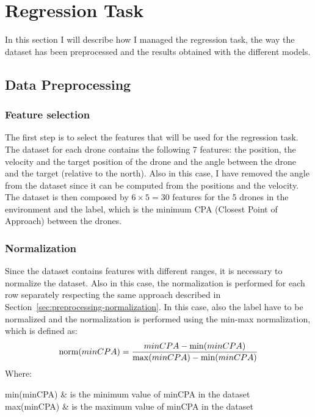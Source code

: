\section{Regression Task} \label{sec:regression}
In this section I will describe how I managed the regression task, the way the dataset has been preprocessed and the results obtained with the different models.

\subsection{Data Preprocessing} \label{sec:preprocessing-regression}

\subsubsection{Feature selection} \label{sec:preprocessing-feature-selection-regression}
The first step is to select the features that will be used for the regression task.
The dataset for each drone contains the following 7 features: the position, the velocity and the target position of the drone and the angle between the drone and the target (relative to the north).
Also in this case, I have removed the angle from the dataset since it can be computed from the positions and the velocity.
The dataset is then composed by $6 \times 5 = 30$ features for the 5 drones in the environment and the label, which is the minimum CPA (Closest Point of Approach) between the drones.

\subsubsection{Normalization} \label{sec:preprocessing-normalization-regression}
Since the dataset contains features with different ranges, it is necessary to normalize the dataset.
Also in this case, the normalization is performed for each row separately respecting the same approach described in Section~\ref{sec:preprocessing-normalization}.
In this case, also the label have to be normalized and the normalization is performed using the min-max normalization, which is defined as:
\begin{equation}
    \label{eq:min-max-normalization}
    \operatorname{norm}(minCPA) = \frac{minCPA - \min(minCPA)}{\max(minCPA) - \min(minCPA)}
\end{equation}
Where:
\begin{conditions}
    min(minCPA) & is the minimum value of minCPA in the dataset \\
    max(minCPA) & is the maximum value of minCPA in the dataset
\end{conditions}


